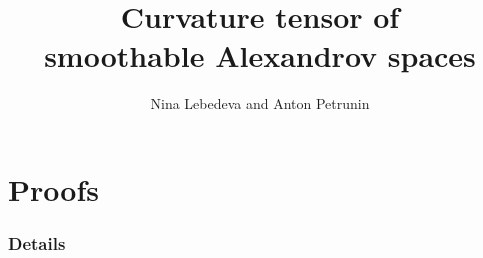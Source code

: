 \documentclass[a4paper,10pt]{article}
\begin{document}

\title{Curvature tensor of\\ smoothable Alexandrov spaces}
\date{}
\author{Nina Lebedeva and Anton Petrunin} 
\maketitle



\tableofcontents




\part*{Proofs}











%

%
%
%

\section{Details}



%

{\sloppy
\printbibliography[heading=bibintoc]
\fussy
}
\end{document}
